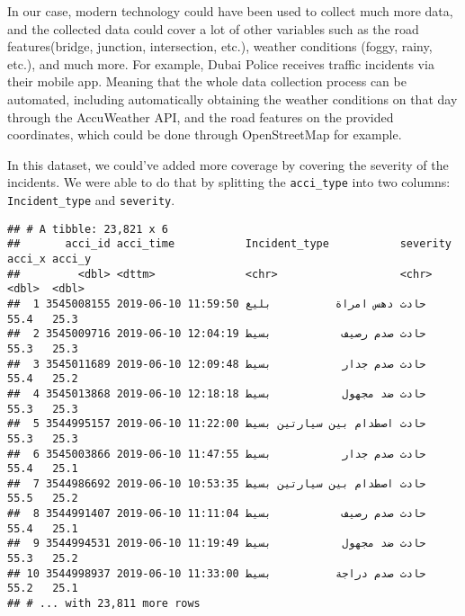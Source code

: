 \documentclass[
]{book}
\newenvironment{Shaded}{\begin{snugshade}}{\end{snugshade}}
\newcommand{\DataTypeTok}[1]{\textcolor[rgb]{0.13,0.29,0.53}{#1}}
\newcommand{\KeywordTok}[1]{\textcolor[rgb]{0.13,0.29,0.53}{\textbf{#1}}}
\newcommand{\NormalTok}[1]{#1}
\newcommand{\OperatorTok}[1]{\textcolor[rgb]{0.81,0.36,0.00}{\textbf{#1}}}
\newcommand{\StringTok}[1]{\textcolor[rgb]{0.31,0.60,0.02}{#1}}
\begin{document}
In our case, modern technology could have been used to collect much more data, and the collected data could cover a lot of other variables such as the road features(bridge, junction, intersection, etc.), weather conditions (foggy, rainy, etc.), and much more. For example, Dubai Police receives traffic incidents via their mobile app. Meaning that the whole data collection process can be automated, including automatically obtaining the weather conditions on that day through the AccuWeather API, and the road features on the provided coordinates, which could be done through OpenStreetMap for example.

In this dataset, we could've added more coverage by covering the severity of the incidents. We were able to do that by splitting the \texttt{acci\_type} into two columns: \texttt{Incident\_type} and \texttt{severity}.

\begin{Shaded}
\end{Shaded}

\begin{verbatim}
## # A tibble: 23,821 x 6
##       acci_id acci_time           Incident_type           severity acci_x acci_y
##         <dbl> <dttm>              <chr>                   <chr>     <dbl>  <dbl>
##  1 3545008155 2019-06-10 11:59:50 حادث دهس امراة          بليغ       25.3   55.4
##  2 3545009716 2019-06-10 12:04:19 حادث صدم رصيف           بسيط       25.3   55.3
##  3 3545011689 2019-06-10 12:09:48 حادث صدم جدار           بسيط       25.2   55.4
##  4 3545013868 2019-06-10 12:18:18 حادث ضد مجهول           بسيط       25.3   55.3
##  5 3544995157 2019-06-10 11:22:00 حادث اصطدام بين سيارتين بسيط       25.3   55.3
##  6 3545003866 2019-06-10 11:47:55 حادث صدم جدار           بسيط       25.1   55.4
##  7 3544986692 2019-06-10 10:53:35 حادث اصطدام بين سيارتين بسيط       25.2   55.5
##  8 3544991407 2019-06-10 11:11:04 حادث صدم رصيف           بسيط       25.1   55.4
##  9 3544994531 2019-06-10 11:19:49 حادث ضد مجهول           بسيط       25.2   55.3
## 10 3544998937 2019-06-10 11:33:00 حادث صدم دراجة          بسيط       25.1   55.2
## # ... with 23,811 more rows
\end{verbatim}
\end{document}
